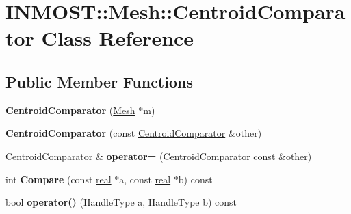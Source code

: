 \hypertarget{classINMOST_1_1Mesh_1_1CentroidComparator}{\section{I\-N\-M\-O\-S\-T\-:\-:Mesh\-:\-:Centroid\-Comparator Class Reference}
\label{classINMOST_1_1Mesh_1_1CentroidComparator}
}
\subsection*{Public Member Functions}
\begin{DoxyCompactItemize}
\item 
\hypertarget{classINMOST_1_1Mesh_1_1CentroidComparator_a673dcf3d8d6e6f0a76e3652727ccb439}{{\bfseries Centroid\-Comparator} (\hyperlink{classINMOST_1_1Mesh}{Mesh} $\ast$m)}\label{classINMOST_1_1Mesh_1_1CentroidComparator_a673dcf3d8d6e6f0a76e3652727ccb439}

\item 
\hypertarget{classINMOST_1_1Mesh_1_1CentroidComparator_a2765d9bbea2f0b8f3a6a1ba1f08db5ef}{{\bfseries Centroid\-Comparator} (const \hyperlink{classINMOST_1_1Mesh_1_1CentroidComparator}{Centroid\-Comparator} \&other)}\label{classINMOST_1_1Mesh_1_1CentroidComparator_a2765d9bbea2f0b8f3a6a1ba1f08db5ef}

\item 
\hypertarget{classINMOST_1_1Mesh_1_1CentroidComparator_a15d08fe8f5b5c53ae5d46e63525afcf1}{\hyperlink{classINMOST_1_1Mesh_1_1CentroidComparator}{Centroid\-Comparator} \& {\bfseries operator=} (\hyperlink{classINMOST_1_1Mesh_1_1CentroidComparator}{Centroid\-Comparator} const \&other)}\label{classINMOST_1_1Mesh_1_1CentroidComparator_a15d08fe8f5b5c53ae5d46e63525afcf1}

\item 
\hypertarget{classINMOST_1_1Mesh_1_1CentroidComparator_a615da7c67a7b9da7e007216c1f14dc17}{int {\bfseries Compare} (const \hyperlink{classINMOST_1_1Storage_a853346784b4a5822a7fac54d8f10f805}{real} $\ast$a, const \hyperlink{classINMOST_1_1Storage_a853346784b4a5822a7fac54d8f10f805}{real} $\ast$b) const }\label{classINMOST_1_1Mesh_1_1CentroidComparator_a615da7c67a7b9da7e007216c1f14dc17}

\item 
\hypertarget{classINMOST_1_1Mesh_1_1CentroidComparator_ac34a997d86c4a887e1806355ee3aa411}{bool {\bfseries operator()} (Handle\-Type a, Handle\-Type b) const }\label{classINMOST_1_1Mesh_1_1CentroidComparator_ac34a997d86c4a887e1806355ee3aa411}


\end{DoxyCompactItemize}
